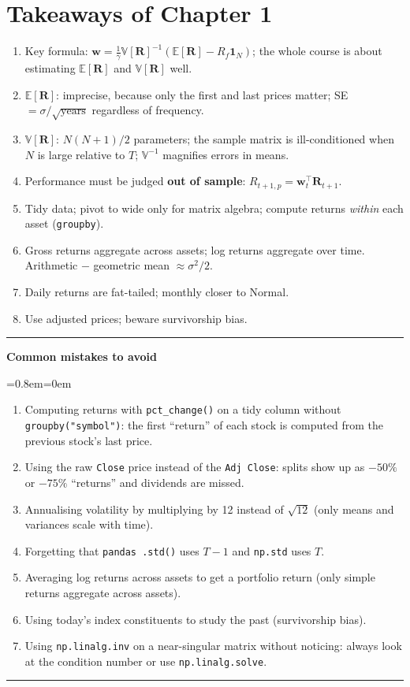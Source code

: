 \documentclass[11pt,a4paper]{report}
\newenvironment{notebox}[1]
  {\par\medskip\Needspace{6\baselineskip}\noindent\rule{\linewidth}{0.4pt}\par\nopagebreak
   \noindent\textbf{#1}\par\nopagebreak
   \begin{list}{}{\leftmargin=0.8em\rightmargin=0em\topsep=2pt}\item[]}
  {\end{list}\nopagebreak\noindent\rule{\linewidth}{0.4pt}\par\medskip}
\newenvironment{mistakes}{\begin{notebox}{Common mistakes to avoid}}{\end{notebox}}
\newcommand{\E}{\mathbb{E}}
\newcommand{\V}{\mathbb{V}}
\newcommand{\one}{\mathbf{1}_N}
\newcommand{\w}{\bm{w}}
\newcommand{\R}{\bm{R}}
\newcommand{\T}{^{\top}}
\newcommand{\Rf}{R_f}
\begin{document}
\section{Takeaways of Chapter 1}
\begin{enumerate}
  \item Key formula: $\w=\frac1\gamma\V[\R]^{-1}(\E[\R]-\Rf\one)$; the whole
    course is about estimating $\E[\R]$ and $\V[\R]$ well.
  \item $\E[\R]$: imprecise, because only the first and last prices matter;
    SE $=\sigma/\sqrt{\text{years}}$ regardless of frequency.
  \item $\V[\R]$: $N(N+1)/2$ parameters; the sample matrix is ill-conditioned
    when $N$ is large relative to $T$; $\V^{-1}$ magnifies errors in means.
  \item Performance must be judged \textbf{out of sample}: $R_{t+1,p}=\w_t\T\R_{t+1}$.
  \item Tidy data; pivot to wide only for matrix algebra; compute returns
    \emph{within} each asset (\texttt{groupby}).
  \item Gross returns aggregate across assets; log returns aggregate over time.
    Arithmetic $-$ geometric mean $\approx\sigma^2/2$.
  \item Daily returns are fat-tailed; monthly closer to Normal.
  \item Use adjusted prices; beware survivorship bias.
\end{enumerate}


\begin{mistakes}
\begin{enumerate}
  \item Computing returns with \texttt{pct\_change()} on a tidy column without
    \texttt{groupby("symbol")}: the first ``return'' of each stock is computed
    from the previous stock's last price.
  \item Using the raw \texttt{Close} price instead of the \texttt{Adj Close}: splits
    show up as $-50\%$ or $-75\%$ ``returns'' and dividends are missed.
  \item Annualising volatility by multiplying by 12 instead of $\sqrt{12}$ (only
    means and variances scale with time).
  \item Forgetting that \texttt{pandas .std()} uses $T-1$ and \texttt{np.std} uses $T$.
  \item Averaging log returns across assets to get a portfolio return (only simple
    returns aggregate across assets).
  \item Using today's index constituents to study the past (survivorship bias).
  \item Using \texttt{np.linalg.inv} on a near-singular matrix without noticing:
    always look at the condition number or use \texttt{np.linalg.solve}.
\end{enumerate}
\end{mistakes}
\end{document}
